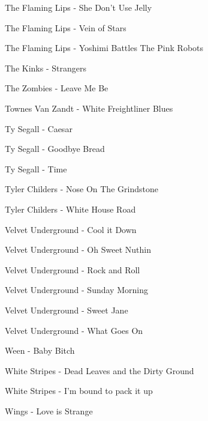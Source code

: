 The Flaming Lips - She Don't Use Jelly \dotfill \pageref{She Don't Use Jelly - The Flaming Lips} 

The Flaming Lips - Vein of Stars \dotfill \pageref{Vein of Stars - The Flaming Lips} 

The Flaming Lips - Yoshimi Battles The Pink Robots \dotfill \pageref{Yoshimi Battles The Pink Robots - The Flaming Lips} 

The Kinks - Strangers \dotfill \pageref{Strangers - The Kinks} 

The Zombies - Leave Me Be \dotfill \pageref{Leave Me Be - The Zombies} 

Townes Van Zandt - White Freightliner Blues \dotfill \pageref{White Freightliner Blues - Townes Van Zandt} 

Ty Segall - Caesar \dotfill \pageref{Caesar - Ty Segall} 

Ty Segall - Goodbye Bread \dotfill \pageref{Goodbye Bread - Ty Segall} 

Ty Segall - Time \dotfill \pageref{Time - Ty Segall} 

Tyler Childers - Nose On The Grindstone \dotfill \pageref{Nose On The Grindstone - Tyler Childers} 

Tyler Childers - White House Road \dotfill \pageref{White House Road - Tyler Childers} 

Velvet Underground - Cool it Down \dotfill \pageref{Cool it Down - Velvet Underground} 

Velvet Underground - Oh Sweet Nuthin \dotfill \pageref{Oh Sweet Nuthin - Velvet Underground} 

Velvet Underground - Rock and Roll \dotfill \pageref{Rock and Roll - Velvet Underground} 

Velvet Underground - Sunday Morning \dotfill \pageref{Sunday Morning - Velvet Underground} 

Velvet Underground - Sweet Jane \dotfill \pageref{Sweet Jane - Velvet Underground} 

Velvet Underground - What Goes On \dotfill \pageref{What Goes On - Velvet Underground} 

Ween - Baby Bitch \dotfill \pageref{Baby Bitch - Ween} 

White Stripes - Dead Leaves and the Dirty Ground \dotfill \pageref{Dead Leaves and the Dirty Ground - White Stripes} 

White Stripes - I'm bound to pack it up \dotfill \pageref{I'm bound to pack it up - White Stripes} 

Wings - Love is Strange \dotfill \pageref{Love is Strange - Wings} 

